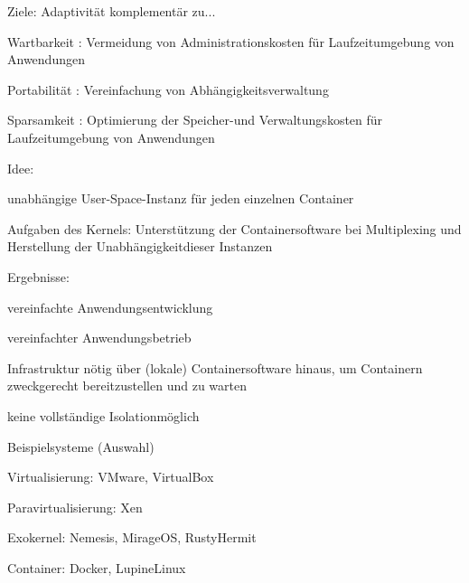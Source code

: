 \documentclass[a4paper]{article}
\newcommand{\cmark}{\ding{51}}
\newcommand{\xmark}{\ding{55}}
\begin{document}
\begin{multicols}{3}
    \begin{itemize*}
        \item
        Ziele: Adaptivität komplementär zu...
        \begin{itemize*}
            \item Wartbarkeit : Vermeidung von Administrationskosten für Laufzeitumgebung von Anwendungen
            \item Portabilität : Vereinfachung von Abhängigkeitsverwaltung
            \item Sparsamkeit : Optimierung der Speicher-und Verwaltungskosten für Laufzeitumgebung von Anwendungen
        \end{itemize*}
        \item
        Idee:
        \begin{itemize*}
            \item unabhängige User-Space-Instanz für jeden einzelnen Container
            \item Aufgaben des Kernels: Unterstützung der Containersoftware bei Multiplexing und Herstellung der Unabhängigkeitdieser Instanzen
        \end{itemize*}
        \item
        Ergebnisse:
        \begin{itemize*}
            \item \cmark vereinfachte Anwendungsentwicklung
            \item \cmark vereinfachter Anwendungsbetrieb
            \item \xmark Infrastruktur nötig über (lokale) Containersoftware hinaus, um Containern zweckgerecht bereitzustellen und zu warten
            \item \xmark keine vollständige Isolationmöglich
        \end{itemize*}
    \end{itemize*}

    Beispielsysteme (Auswahl)

    \begin{itemize*}
        \item
        Virtualisierung: VMware, VirtualBox
        \item
        Paravirtualisierung: Xen
        \item
        Exokernel: Nemesis, MirageOS, RustyHermit
        \item
        Container: Docker, LupineLinux
    \end{itemize*}



\end{multicols}
\end{document}
